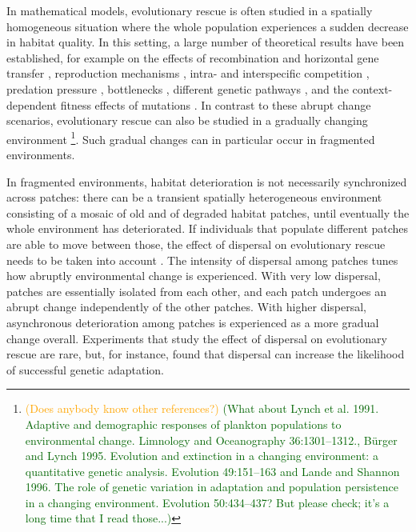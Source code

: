 \documentclass[11pt]{article}
\newcommand{\hildegard}[1]{\textcolor{darkgreen}{(#1)}}
\newcommand{\pete}[1]{\textcolor{orange}{(#1)}}
\begin{document}
In mathematical models, evolutionary rescue is often studied in a spatially homogeneous situation where the whole population experiences a sudden decrease in habitat quality. In this setting, a large number of theoretical results have been established, for example on the effects of recombination \citep{uecker_2015} and 
horizontal gene transfer \citep{tazzyman_2014}, 
reproduction mechanisms \citep{glemin_2013,uecker_2017}, intra- and interspecific competition \citep{osmond_2013}, predation pressure \citep{yamamichi_2015}, 
bottlenecks \citep{martin_2013}, 
different genetic pathways \citep{osmond_2019}, and the context-dependent fitness effects of mutations \citep{anciaux_2018}. In contrast to these abrupt change scenarios, evolutionary rescue can also be studied in a gradually changing environment \citep[e.g.][]{osmond_2017}\footnote{\pete{Does anybody know other references?} \hildegard{What about Lynch et al. 1991. Adaptive and  demographic responses of plankton populations to environmental change. Limnology and Oceanography 36:1301--1312., B{\"u}rger and Lynch 1995. Evolution and extinction in a changing environment: a quantitative genetic analysis. Evolution 49:151--163 and Lande and Shannon 1996. The role of  genetic  variation  in adaptation and population persistence in a changing environment. Evolution 50:434--437? But please check; it's a long time that I read those...}}. 
Such gradual changes can in particular occur in fragmented environments.

In fragmented environments, habitat deterioration is not necessarily synchronized across patches: there can be a transient spatially heterogeneous environment consisting of a mosaic of old and of degraded habitat patches, until eventually the whole environment has deteriorated. If individuals that populate different patches are able to move between those, the effect of dispersal on evolutionary rescue needs to be taken into account \citep{uecker_2014, tomasini_2019}. The intensity of dispersal among patches tunes how abruptly environmental change is experienced. With very low dispersal, patches are essentially isolated from each other, and each patch undergoes an abrupt change independently of the other patches. With higher dispersal, asynchronous deterioration among patches is experienced as a more gradual change overall.
Experiments that study the effect of dispersal on evolutionary rescue are rare, but, for instance, \citet{bell_2011} found that  dispersal can increase the likelihood of successful genetic adaptation. 
\end{document}
